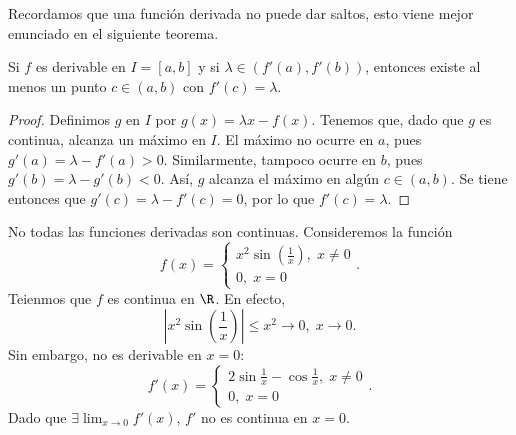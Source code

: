 \begin{observation}
\normalfont Recordamos que una función derivada no puede dar saltos, esto viene mejor enunciado en el siguiente teorema.
\end{observation}
\begin{ftheorem}
	\normalfont Si $\displaystyle f $ es derivable en $\displaystyle I = \left[a,b\right]  $ y si $\displaystyle \lambda \in \left(f'\left(a\right), f'\left(b\right)\right) $, entonces existe al menos un punto $\displaystyle c \in \left(a,b\right) $ con $\displaystyle f'\left(c\right) = \lambda  $. 
\end{ftheorem}
\begin{proof}
Definimos $\displaystyle g $ en $\displaystyle I $ por $\displaystyle g\left(x\right) = \lambda x - f\left(x\right) $. Tenemos que, dado que $\displaystyle g $ es continua, alcanza un máximo en $\displaystyle I $. El máximo no ocurre en $\displaystyle a $, pues $\displaystyle g'\left(a\right) = \lambda - f'\left(a\right) > 0 $. Similarmente, tampoco ocurre en $\displaystyle b $, pues $\displaystyle g'\left(b\right) = \lambda -g'\left(b\right) < 0 $. Así, $\displaystyle g $ alcanza el máximo en algún $\displaystyle c \in \left(a,b\right) $. Se tiene entonces que $\displaystyle g'\left(c\right) = \lambda - f'\left(c\right) = 0 $, por lo que $\displaystyle f'\left(c\right) = \lambda  $.
\end{proof}

\begin{eg}
\normalfont No todas las funciones derivadas son continuas. Consideremos la función 
\[ f\left(x\right) = 
\begin{cases}
x^{2}\sin\left(\frac{1}{x}\right), \; x \neq 0 \\
0, \; x = 0
\end{cases}
.\]
Teienmos que $\displaystyle f $ es continua en $\displaystyle \R $. En efecto, 
\[ \left|x^{2}\sin\left(\frac{1}{x}\right)\right| \leq x^{2} \to 0, \; x \to 0 .\]
Sin embargo, no es derivable en $\displaystyle x = 0 $:
\[ f'\left(x\right) = 
\begin{cases}
	2\sin \frac{1}{x} - \cos \frac{1}{x}, \; x \neq 0 \\
	0, \; x = 0
\end{cases}
.\]
Dado que $\displaystyle \exists\lim_{x \to 0}f'\left(x\right) $, $\displaystyle f' $ no es continua en $\displaystyle x = 0 $.
\end{eg}
